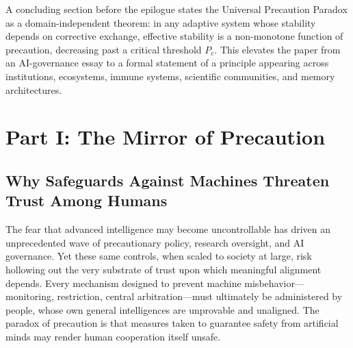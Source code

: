 \documentclass[11pt,a4paper]{article}
\theoremstyle{definition}
\theoremstyle{plain}
\begin{document}
A concluding section before the epilogue states the Universal Precaution Paradox as a domain-independent theorem: in any adaptive system whose stability depends on corrective exchange, effective stability is a non-monotone function of precaution, decreasing past a critical threshold $P_c$. This elevates the paper from an AI-governance essay to a formal statement of a principle appearing across institutions, ecosystems, immune systems, scientific communities, and memory architectures.

\newpage

\tableofcontents
{}
\newpage

\section*{Part I: The Mirror of Precaution}

\subsection*{Why Safeguards Against Machines Threaten Trust Among Humans}

The fear that advanced intelligence may become uncontrollable has driven an unprecedented wave of precautionary policy, research oversight, and AI governance.
Yet these same controls, when scaled to society at large, risk hollowing out the very substrate of trust upon which meaningful alignment depends.
Every mechanism designed to prevent machine misbehavior---monitoring, restriction, central arbitration---must ultimately be administered by people, whose own general intelligences are unprovable and unaligned.
The paradox of precaution is that measures taken to guarantee safety from artificial minds may render human cooperation itself unsafe.
\end{document}
